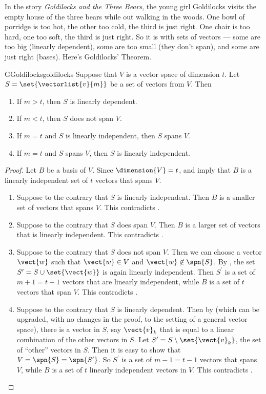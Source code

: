 %
In the story {\sl Goldilocks and the Three Bears}, the young girl Goldilocks visits the empty house of the three bears while out walking in the woods.  One bowl of porridge is too hot, the other too cold, the third is just right.  One chair is too hard, one too soft, the third is just right.  So it is with sets of vectors --- some are too big (linearly dependent), some are too small (they don't span), and some are just right (bases).  Here's Goldilocks' Theorem.
%
\begin{theorem}{G}{Goldilocks}{goldilocks}
Suppose that $V$ is a vector space of dimension $t$.  Let $S=\set{\vectorlist{v}{m}}$ be a set of vectors from $V$.  Then
\begin{enumerate}
\item  If $m>t$, then $S$ is linearly dependent.
\item  If $m<t$, then $S$ does not span $V$.
\item  If $m=t$ and $S$ is linearly independent, then $S$ spans $V$.
\item  If $m=t$ and $S$ spans $V$, then $S$ is linearly independent.
\end{enumerate}
\end{theorem}
%
\begin{proof}
Let $B$ be a basis of $V$.  Since $\dimension{V}=t$,  and  imply that $B$ is a linearly independent set of $t$ vectors that spans $V$.
\begin{enumerate}
%
\item Suppose to the contrary that $S$ is linearly independent.  Then $B$ is a smaller set of vectors that spans $V$.   This contradicts .
%
\item Suppose to the contrary that $S$ does span $V$.  Then $B$ is a larger set of vectors that is linearly independent.   This contradicts .
%
\item Suppose to the contrary that $S$ does not span $V$.  Then we can choose a vector $\vect{w}$ such that $\vect{w}\in V$ and $\vect{w}\not\in\spn{S}$.  By , the set $S^\prime=S\cup\set{\vect{w}}$ is again linearly independent.  Then $S^\prime$ is a set of $m+1=t+1$ vectors that are linearly independent, while $B$ is a set of $t$ vectors that span $V$.    This contradicts .
%
\item Suppose to the contrary that $S$ is linearly dependent.  Then by  (which can be upgraded, with no changes in the proof, to the setting of a general vector space), there is a vector in $S$, say $\vect{v}_k$ that is equal to a linear combination of the other vectors in $S$.  Let $S^\prime=S\setminus\set{\vect{v}_k}$, the set of ``other'' vectors in $S$.  Then it is easy to show that $V=\spn{S}=\spn{S^\prime}$.  So $S^\prime$ is a set of $m-1=t-1$ vectors that spans $V$, while $B$ is a set of $t$ linearly independent vectors in $V$.  This contradicts .
%
\end{enumerate}
%
\end{proof}
